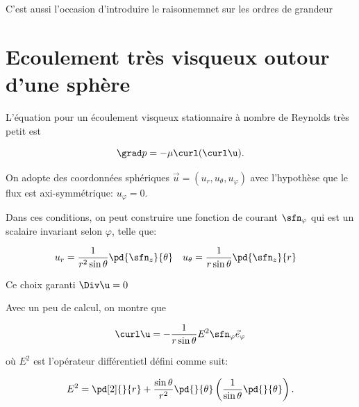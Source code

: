 
C'est aussi l'occasion d'introduire le raisonnemnet sur les ordres de grandeur

\section{Ecoulement très visqueux outour d'une sphère}


L'équation pour un écoulement visqueux stationnaire à nombre de Reynolds très petit est  

\begin{equation}
  \grad p = - \mu \curl(\curl\u). 
  \label{eq:viscous}
\end{equation}

On adopte des coordonnées sphériques $\vec{u}=(u_r, u_\theta, u_\varphi)$ avec l'hypothèse que le flux est axi-symmétrique: $u_\varphi=0$. 

Dans ces conditions, on peut construire une fonction de courant $\sfn_\varphi$ qui est un scalaire invariant selon $\varphi$, telle que: 

\begin{equation}
  \begin{split}
  u_r &= \frac{1}{r^2 \sin\theta}\pd{\sfn_z}{\theta}  & 
  u_\theta &= \frac{1}{r \sin\theta}\pd{\sfn_z}{r}  
  \end{split}
  \label{eq:potentiel_spherique}
\end{equation}

Ce choix garanti $\Div \u=0$ 

Avec un peu de calcul, on montre que 

\begin{displaymath}
  \curl \u = -\frac{1}{r\sin\theta}E^2\sfn_\varphi \vec{e}_{\varphi}
\end{displaymath}

où $E^2$ est l'opérateur différentietl défini comme suit: 

\begin{displaymath}
  E^2 = \pd[2]{}{r} + \frac{\sin\theta}{r^2}\pd{}{\theta}\left(\frac{1}{\sin\theta}\pd{}{\theta}\right). 
\end{displaymath}

